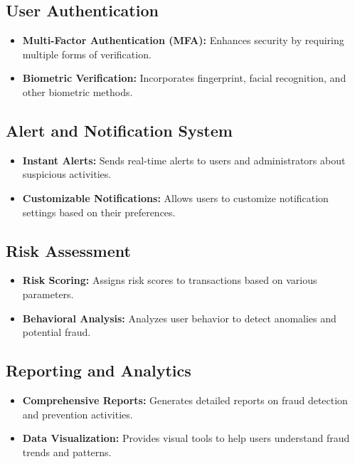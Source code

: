 \documentclass[a4paper,12pt]{report}
\begin{document}
	\subsection{User Authentication}
	\begin{itemize}
		\item \textbf{Multi-Factor Authentication (MFA):} Enhances security by requiring multiple forms of verification.
		\item \textbf{Biometric Verification:} Incorporates fingerprint, facial recognition, and other biometric methods.
	\end{itemize}
	
	\subsection{Alert and Notification System}
	\begin{itemize}
		\item \textbf{Instant Alerts:} Sends real-time alerts to users and administrators about suspicious activities.
		\item \textbf{Customizable Notifications:} Allows users to customize notification settings based on their preferences.
	\end{itemize}
	
	\subsection{Risk Assessment}
	\begin{itemize}
		\item \textbf{Risk Scoring:} Assigns risk scores to transactions based on various parameters.
		\item \textbf{Behavioral Analysis:} Analyzes user behavior to detect anomalies and potential fraud.
	\end{itemize}
	
	\subsection{Reporting and Analytics}
	\begin{itemize}
		\item \textbf{Comprehensive Reports:} Generates detailed reports on fraud detection and prevention activities.
		\item \textbf{Data Visualization:} Provides visual tools to help users understand fraud trends and patterns.
	\end{itemize}
	
\end{document}
